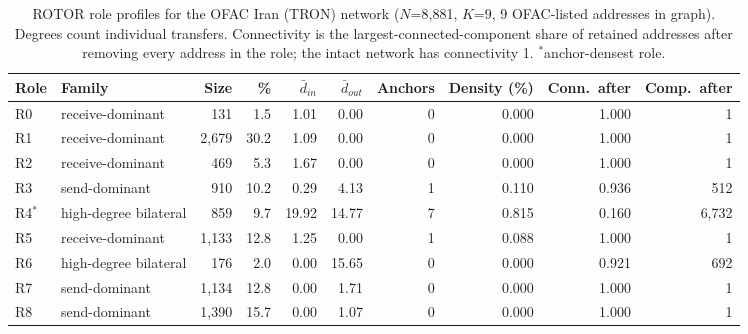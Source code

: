 \begin{table}[htbp]
\centering
\caption{ROTOR role profiles for the OFAC Iran (TRON) network ($N$=8,881, $K$=9, 9 OFAC-listed addresses in graph). Degrees count individual transfers. Connectivity is the largest-connected-component share of retained addresses after removing every address in the role; the intact network has connectivity 1. $^*$anchor-densest role.}
\label{tab:ofac-iran-roles}
\small
\begin{tabular}{llrrrrrrrr}
\toprule
\textbf{Role} & \textbf{Family} & \textbf{Size} & \textbf{\%} & $\bar{d}_{in}$ & $\bar{d}_{out}$ & \textbf{Anchors} & \textbf{Density (\%)} & \textbf{Conn.\ after} & \textbf{Comp.\ after} \\
\midrule
R0 & receive-dominant & 131 & 1.5 & 1.01 & 0.00 & 0 & 0.000 & 1.000 & 1 \\
R1 & receive-dominant & 2,679 & 30.2 & 1.09 & 0.00 & 0 & 0.000 & 1.000 & 1 \\
R2 & receive-dominant & 469 & 5.3 & 1.67 & 0.00 & 0 & 0.000 & 1.000 & 1 \\
R3 & send-dominant & 910 & 10.2 & 0.29 & 4.13 & 1 & 0.110 & 0.936 & 512 \\
R4$^*$ & high-degree bilateral & 859 & 9.7 & 19.92 & 14.77 & 7 & 0.815 & 0.160 & 6,732 \\
R5 & receive-dominant & 1,133 & 12.8 & 1.25 & 0.00 & 1 & 0.088 & 1.000 & 1 \\
R6 & high-degree bilateral & 176 & 2.0 & 0.00 & 15.65 & 0 & 0.000 & 0.921 & 692 \\
R7 & send-dominant & 1,134 & 12.8 & 0.00 & 1.71 & 0 & 0.000 & 1.000 & 1 \\
R8 & send-dominant & 1,390 & 15.7 & 0.00 & 1.07 & 0 & 0.000 & 1.000 & 1 \\
\bottomrule
\end{tabular}
\end{table}

